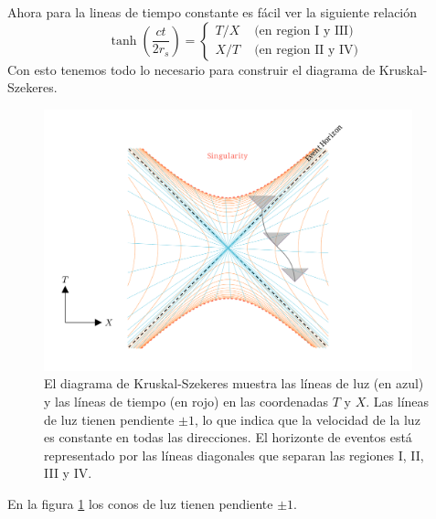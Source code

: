 \noindent Ahora para la lineas de tiempo constante es fácil ver la siguiente relación
\begin{equation}
    \tanh \left(\frac{ct}{2 r_s}\right)=\left\{\begin{array}{ll}
        T / X & \text { (en region I y III) } \\
        X / T & \text { (en region II y IV) }
    \end{array}\right.
\end{equation}
Con esto tenemos todo lo necesario para construir el diagrama de Kruskal-Szekeres.
\begin{figure}[H]
    \begin{small}
        \begin{center}
            \includegraphics[width=0.95\textwidth]{AgujerosNegros/Schwarzschild/media/images/Kruskal_Szekeres_diagram3_ManimCE_v0.19.0.png}
        \end{center}
        \caption{El diagrama de Kruskal-Szekeres muestra las líneas de luz (en azul) y las líneas de tiempo (en rojo) en las coordenadas \(T\) y \(X\). Las líneas de luz tienen pendiente \(\pm 1\), lo que indica que la velocidad de la luz es constante en todas las direcciones. El horizonte de eventos está representado por las líneas diagonales que separan las regiones I, II, III y IV.}
        \label{fig:Kruskal_Szekeres_diagram}
    \end{small}
\end{figure}
En la figura \ref{fig:Kruskal_Szekeres_diagram} los conos de luz tienen pendiente \(\pm 1\).
